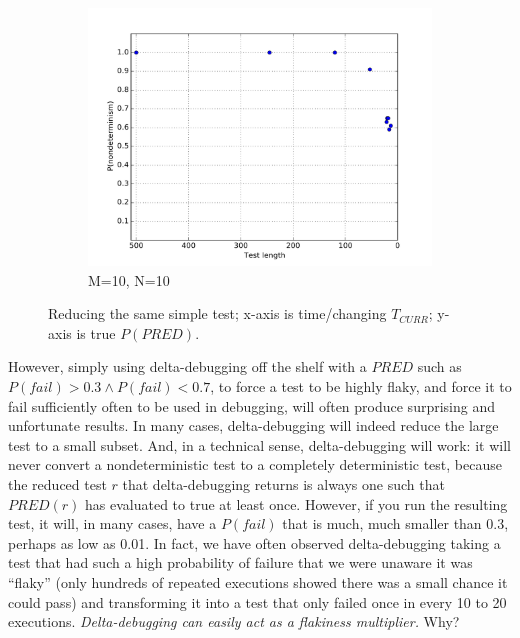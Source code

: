 \begin{figure}
\begin{subfigure}{0.30\columnwidth}
\includegraphics[width=\columnwidth]{lengthddminforceprep}
\caption{M=10, N=10}
\label{fig:p3}
\end{subfigure}
\caption{Reducing the same simple test; x-axis is time/changing
  $T_\mathit{CURR}$; y-axis is true $P(\mathit{PRED})$.}
\end{figure}

However, simply using delta-debugging off the shelf with a $\mathit{PRED}$
such as $P(\mathit{fail}) > 0.3 \wedge P(\mathit{fail}) < 0.7$, to force a test to be highly flaky, and force it to fail
sufficiently often to be used in debugging, will often produce
surprising and unfortunate results.  In many cases,
delta-debugging will indeed reduce the large test to a small subset.
And, in a technical sense, delta-debugging will work:  it will never
convert a nondeterministic test to a completely deterministic test,
because the reduced test $r$ that delta-debugging returns is always one
such that $\mathit{PRED}(r)$ has evaluated to true at least once.
However, if you run the resulting test, it will, in many cases, have a
$P(\mathit{fail})$ that is much, much smaller than
0.3, perhaps as low as 0.01.  In fact, we have often observed
delta-debugging taking a test that had such a high probability of
failure that we were unaware it was ``flaky'' (only hundreds of repeated executions showed there was
a small chance it could pass) and transforming it into a
test that only failed once in every 10 to 20 executions.
\emph{Delta-debugging can easily act as a flakiness multiplier.}  Why?


